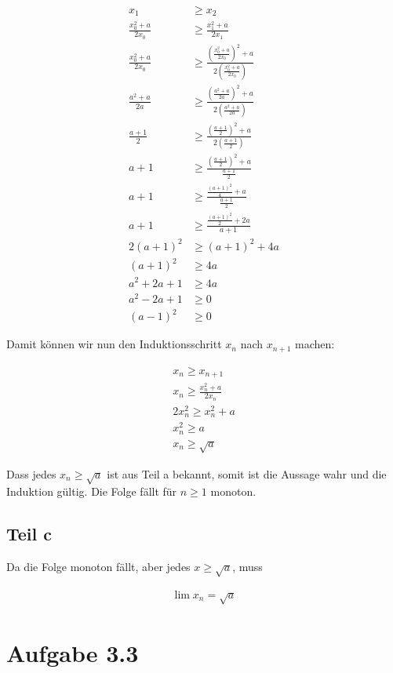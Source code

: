 \documentclass[a4paper,german,12pt,smallheadings]{scrartcl}
\begin{document}
\begin{align*}
  x_1 &\ge x_2 \\
  \frac{x_0^2 + a}{2x_0} &\ge \frac{x_1^2 + a}{2x_1} \\
  \frac{x_0^2 + a}{2x_0} &\ge \frac{\left(\frac{x_0^2 + a}{2x_0}\right)^2 + a}{2\left(\frac{x_0^2 + a}{2x_0}\right)} \\
  \frac{a^2 + a}{2a} &\ge \frac{\left(\frac{a^2 + a}{2a}\right)^2 + a}{2\left(\frac{a^2 + a}{2a}\right)} \\
  \frac{a + 1}{2} &\ge \frac{\left(\frac{a + 1}{2}\right)^2 + a}{2\left(\frac{a + 1}{2}\right)} \\
  a + 1 &\ge \frac{\left(\frac{a + 1}{2}\right)^2 + a}{\frac{a + 1}{2}} \\
  a + 1 &\ge \frac{\frac{(a+1)^2}{4} + a}{\frac{a + 1}{2}} \\
  a + 1 &\ge \frac{\frac{(a+1)^2}{2} + 2a}{a+1} \\
  2(a + 1)^2 &\ge (a+1)^2 + 4a \\
  (a + 1)^2 &\ge 4a \\
  a^2+2a+1 &\ge 4a \\
  a^2-2a+1 &\ge 0 \\
  (a-1)^2 &\ge 0
\end{align*}

Damit können wir nun den Induktionsschritt $x_n$ nach $x_{n+1}$ machen:

\begin{align*}
  x_{n} \ge x_{n+1} \\
  x_n \ge \frac{x_n^2 + a}{2x_n} \\
  2x_n^2 \ge x_n^2 + a \\
  x_n^2 \ge a \\
  x_n \ge \sqrt{a}
\end{align*}

Dass jedes $x_n \ge \sqrt{a}$ ist aus Teil a bekannt, somit ist die Aussage
wahr und die Induktion gültig. Die Folge fällt für $n \ge 1$ monoton.

\subsection*{Teil c}
Da die Folge monoton fällt, aber jedes $x \ge \sqrt{a}$, muss

\begin{align*}
  \lim x_n = \sqrt{a}
\end{align*}

\section*{Aufgabe 3.3}
\end{document}
